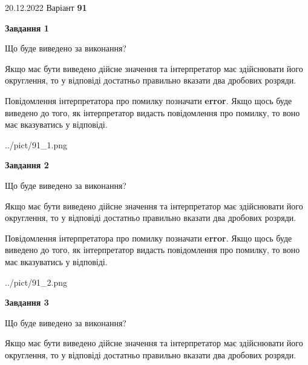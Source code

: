 \documentclass[12pt, ukrainian]{article}
\begin{document}
{20.12.2022 Варіант \No \textbf { 91 }\par}
{
\begin {Large}

{\begin {center}\textbf{Завдання 1}\end {center}}\par
Що буде виведено за виконання? \par

Якщо має бути виведено дійсне значення та інтерпретатор має здійснювати його округлення, 
то у відповіді достатньо правильно вказати два дробових розряди.

Повідомлення інтерпретатора про помилку позначати \textbf{error}.
Якщо щось буде виведено до того, як інтерпретатор видасть повідомлення про помилку, 
то воно має вказуватись у відповіді. \par

\begin{center}
	{../pict/91_1.png}
\end{center}
\newpage

{\begin {center}\textbf{Завдання 2}\end {center}}\par
Що буде виведено за виконання? \par

Якщо має бути виведено дійсне значення та інтерпретатор має здійснювати його округлення, 
то у відповіді достатньо правильно вказати два дробових розряди.

Повідомлення інтерпретатора про помилку позначати \textbf{error}.
Якщо щось буде виведено до того, як інтерпретатор видасть повідомлення про помилку, 
то воно має вказуватись у відповіді. \par

\begin{center}
	{../pict/91_2.png}
\end{center}
\newpage

{\begin {center}\textbf{Завдання 3}\end {center}}\par
Що буде виведено за виконання? \par

Якщо має бути виведено дійсне значення та інтерпретатор має здійснювати його округлення, 
то у відповіді достатньо правильно вказати два дробових розряди.


\end{Large}}
\end{document}
